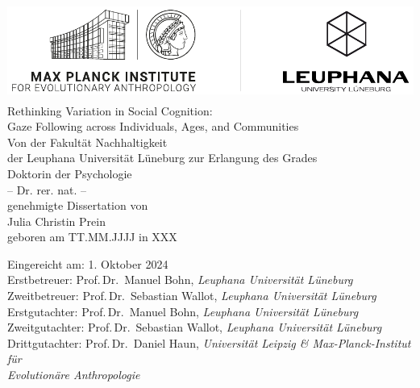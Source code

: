 \documentclass[
]{scrbook}
\author{}
\date{\vspace{-2.5em}}
\begin{document}
\begin{titlepage}                   
    \begin{center}
        \includegraphics[height=3.2cm]{logo.pdf}\\[40mm]
        
        \huge {\linespread{1.5} Rethinking Variation in Social Cognition: \\ Gaze Following across Individuals, Ages, and Communities}\\[30mm]
        
                
        \normalsize Von der Fakultät Nachhaltigkeit \\ der Leuphana Universität Lüneburg zur Erlangung des Grades\\
        Doktorin der Psychologie\\-- Dr. rer. nat. --\\[10mm]
        
        genehmigte Dissertation von\\[10mm]
        Julia Christin Prein\\
        geboren am TT.MM.JJJJ in XXX
        
    \vspace*{\fill} 
    \end{center}
    
    \newpage
    \thispagestyle{empty}
    \begin{flushleft}
      \begin{normalsize}
      
      \vspace*{\fill} 
            Eingereicht am: \tabto*{30mm} 1. Oktober 2024 \\[10mm]
            
            Erstbetreuer: \tabto*{30mm} Prof.\,Dr.\, Manuel Bohn, \textit{Leuphana Universität Lüneburg}\\
                Zweitbetreuer: \tabto*{30mm} Prof.\,Dr.\, Sebastian Wallot, \textit{Leuphana Universität Lüneburg}\\[10mm]
                
                Erstgutachter: \tabto*{30mm} Prof.\,Dr.\, Manuel Bohn, \textit{Leuphana Universität Lüneburg}\\
                Zweitgutachter: \tabto*{30mm} Prof.\,Dr.\, Sebastian Wallot, \textit{Leuphana Universität Lüneburg}\\
                Drittgutachter: \tabto*{30mm} Prof.\,Dr.\, Daniel Haun, \textit{Universität Leipzig \& Max-Planck-Institut für\\
                \tabto*{30mm} Evolutionäre Anthropologie}\\[10mm]
        \end{normalsize}
    \end{flushleft}
    
\end{titlepage}
\end{document}
